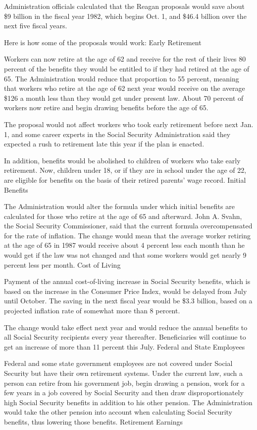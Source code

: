 Administration officials calculated that the Reagan proposals would save
about \$9 billion in the fiscal year 1982, which begins Oct. 1, and
\$46.4 billion over the next five fiscal years.

Here is how some of the proposals would work: Early Retirement

Workers can now retire at the age of 62 and receive for the rest of
their lives 80 percent of the benefits they would be entitled to if they
had retired at the age of 65. The Administration would reduce that
proportion to 55 percent, meaning that workers who retire at the age of
62 next year would receive on the average \$126 a month less than they
would get under present law. About 70 percent of workers now retire and
begin drawing benefits before the age of 65.

The proposal would not affect workers who took early retirement before
next Jan. 1, and some career experts in the Social Security
Administration said they expected a rush to retirement late this year if
the plan is enacted.

In addition, benefits would be abolished to children of workers who take
early retirement. Now, children under 18, or if they are in school under
the age of 22, are eligible for benefits on the basis of their retired
parents' wage record. Initial Benefits

The Administration would alter the formula under which initial benefits
are calculated for those who retire at the age of 65 and afterward. John
A. Svahn, the Social Security Commissioner, said that the current
formula overcompensated for the rate of inflation. The change would mean
that the average worker retiring at the age of 65 in 1987 would receive
about 4 percent less each month than he would get if the law was not
changed and that some workers would get nearly 9 percent less per month.
Cost of Living

Payment of the annual cost-of-living increase in Social Security
benefits, which is based on the increase in the Consumer Price Index,
would be delayed from July until October. The saving in the next fiscal
year would be \$3.3 billion, based on a projected inflation rate of
somewhat more than 8 percent.

The change would take effect next year and would reduce the annual
benefits to all Social Security recipients every year thereafter.
Beneficiaries will continue to get an increase of more than 11 percent
this July. Federal and State Employees

Federal and some state government employees are not covered under Social
Security but have their own retirement systems. Under the current law,
such a person can retire from his government job, begin drawing a
pension, work for a few years in a job covered by Social Security and
then draw disproportionately high Social Security benefits in addition
to his other pension. The Administration would take the other pension
into account when calculating Social Security benefits, thus lowering
those benefits. Retirement Earnings

